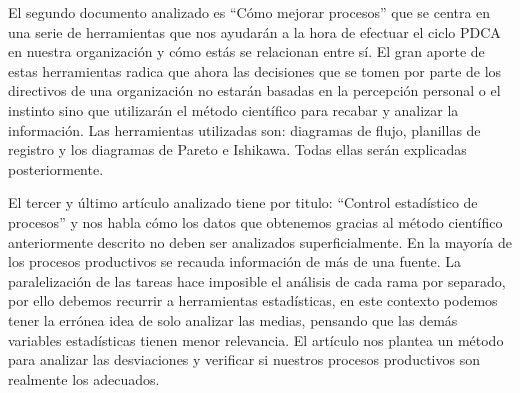\documentclass[spanish, fleqn]{article}
\begin{document}
	El segundo documento analizado es ``Cómo mejorar procesos''\cite{cle2} que
	se centra en una serie de herramientas que nos ayudarán a la hora de
	efectuar el ciclo PDCA en nuestra organización y cómo estás se relacionan 
	entre sí. El gran aporte de estas herramientas radica que ahora las 
	decisiones que se tomen por parte de los directivos de una organización no 
	estarán basadas en la percepción personal o el instinto sino que utilizarán
	el método científico para recabar y analizar la información. 
	Las herramientas utilizadas son: diagramas de flujo, planillas de registro y
	los diagramas de Pareto e  Ishikawa. Todas ellas serán explicadas
	posteriormente.

	El tercer y último artículo analizado tiene por titulo: ``Control 
	estadístico de procesos''\cite{cle3} y nos habla cómo los datos que
	obtenemos gracias al método científico anteriormente descrito no deben ser
	analizados superficialmente. En la mayoría de los procesos productivos se
	recauda información de más de una fuente. La paralelización de las tareas
	hace imposible el análisis de cada rama por separado, por ello debemos 
	recurrir a herramientas estadísticas, en este contexto podemos tener la 
	errónea idea de solo analizar las medias, pensando que las demás variables 
	estadísticas tienen menor relevancia. El artículo nos plantea un método para
	analizar las desviaciones y verificar si nuestros procesos productivos son
	realmente los adecuados.
	\newpage
\end{document}
